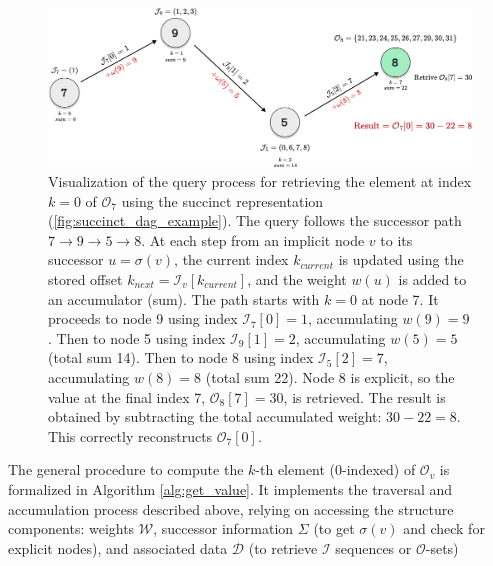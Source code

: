 \begin{figure}[htbp]

    \includegraphics[width=\textwidth]{assets/dag_query4.pdf}
    \caption{Visualization of the query process for retrieving the element at index $k=0$ of $\mathcal{O}_7$ using the succinct representation (\autoref{fig:succinct_dag_example}). The query follows the successor path $7 \to 9 \to 5 \to 8$. At each step from an implicit node $v$ to its successor $u=\sigma(v)$, the current index $k_{current}$ is updated using the stored offset $k_{next} = \mathcal{I}_v[k_{current}]$, and the weight $w(u)$ is added to an accumulator (sum). The path starts with $k=0$ at node 7. It proceeds to node 9 using index $\mathcal{I}_7[0]=1$, accumulating $w(9)=9$. Then to node 5 using index $\mathcal{I}_9[1]=2$, accumulating $w(5)=5$ (total sum 14). Then to node 8 using index $\mathcal{I}_5[2]=7$, accumulating $w(8)=8$ (total sum 22). Node 8 is explicit, so the value at the final index 7, $\mathcal{O}_8[7]=30$, is retrieved. The result is obtained by subtracting the total accumulated weight: $30 - 22 = 8$. This correctly reconstructs $\mathcal{O}_7[0]$.}
    \label{fig:query_path_node7}
\end{figure}

The general procedure to compute the $k$-th element ($0$-indexed) of $\mathcal{O}_v$ is formalized in Algorithm \ref{alg:get_value}. It implements the traversal and accumulation process described above, relying on accessing the structure components: weights $\mathcal{W}$, successor information $\Sigma$ (to get $\sigma(v)$ and check for explicit nodes), and associated data $\mathcal{D}$ (to retrieve $\mathcal{I}$ sequences or $\mathcal{O}$-sets)

